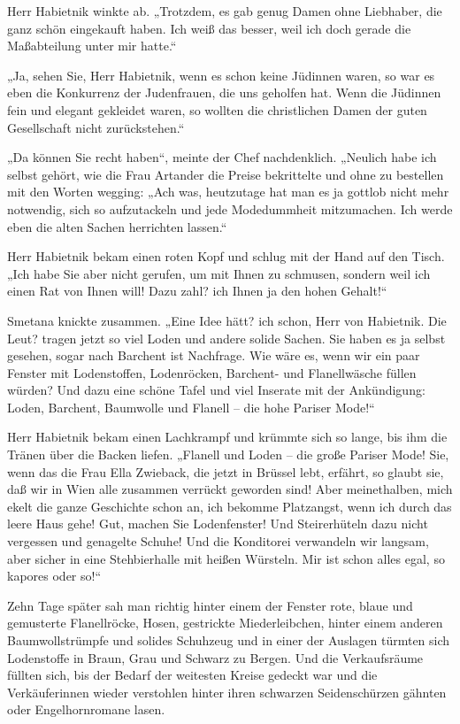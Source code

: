 Herr Habietnik winkte ab. „Trotzdem, es gab genug Damen ohne
Liebhaber, die ganz schön eingekauft haben. Ich weiß das besser,
weil ich doch gerade die Maßabteilung unter mir hatte.“

„Ja, sehen Sie, Herr Habietnik, wenn es schon keine Jüdinnen waren,
so war es eben die Konkurrenz der Judenfrauen, die uns geholfen
hat. Wenn die Jüdinnen fein und elegant gekleidet waren, so wollten
die christlichen Damen der guten Gesellschaft nicht zurückstehen.“

„Da können Sie recht haben“, meinte der Chef nachdenklich. „Neulich
habe ich selbst gehört, wie die Frau Artander die Preise
bekrittelte und ohne zu bestellen mit den Worten wegging: „Ach was,
heutzutage hat man es ja gottlob nicht mehr notwendig, sich so
aufzutackeln und jede Modedummheit mitzumachen. Ich werde eben die
alten Sachen herrichten lassen.“

Herr Habietnik bekam einen roten Kopf und schlug mit der Hand auf
den Tisch. „Ich habe Sie aber nicht gerufen, um mit Ihnen zu
schmusen, sondern weil ich einen  Rat von Ihnen
will! Dazu zahl? ich Ihnen ja den hohen Gehalt!“

Smetana knickte zusammen. „Eine Idee hätt? ich schon, Herr von
Habietnik. Die Leut? tragen jetzt so viel Loden und andere solide
Sachen. Sie haben es ja selbst gesehen, sogar nach Barchent ist
Nachfrage. Wie wäre es, wenn wir ein paar Fenster mit Lodenstoffen,
Lodenröcken, Barchent- und Flanellwäsche füllen würden? Und dazu
eine schöne Tafel und viel Inserate mit der Ankündigung: Loden,
Barchent, Baumwolle und Flanell – die hohe Pariser Mode!“

Herr Habietnik bekam einen Lachkrampf und krümmte sich so lange,
bis ihm die Tränen über die Backen liefen. „Flanell und Loden – die
große Pariser Mode! Sie, wenn das die Frau Ella Zwieback, die jetzt
in Brüssel lebt, erfährt, so glaubt sie, daß wir in Wien alle
zusammen verrückt geworden sind! Aber meinethalben, mich ekelt die
ganze Geschichte schon an, ich bekomme Platzangst, wenn ich durch
das leere Haus gehe! Gut, machen Sie Lodenfenster! Und
Steirerhüteln dazu nicht vergessen und genagelte Schuhe! Und die
Konditorei verwandeln wir langsam, aber sicher in eine
Stehbierhalle mit heißen Würsteln. Mir ist schon alles egal, so
kapores oder so!“

Zehn Tage später sah man richtig hinter einem der Fenster rote,
blaue und gemusterte Flanellröcke, Hosen, gestrickte
Miederleibchen, hinter einem anderen Baumwollstrümpfe und solides
Schuhzeug und in einer der Auslagen türmten sich Lodenstoffe in
Braun, Grau und Schwarz zu Bergen. Und die Verkaufsräume füllten
sich, bis der  Bedarf der weitesten Kreise gedeckt
war und die Verkäuferinnen wieder verstohlen hinter ihren schwarzen
Seidenschürzen gähnten oder Engelhornromane lasen.

